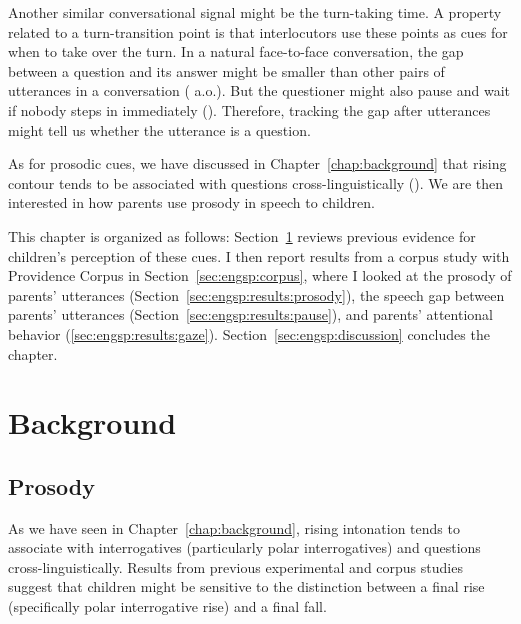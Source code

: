 Another similar conversational signal might be the turn-taking time. A property related to a turn-transition point is that interlocutors use these points as cues for when to take over the turn. In a natural face-to-face conversation, the gap between a question and its answer might be smaller than other pairs of utterances in a conversation (\citealt{tice2011turn} a.o.). But the questioner might also pause and wait if nobody steps in immediately (\cite{sacks1978pause}). Therefore, tracking the gap after utterances might tell us whether the utterance is a question.

As for prosodic cues, we have discussed in Chapter~\ref{chap:background} that rising contour tends to be associated with questions cross-linguistically (\cite{gussenhovenchen2000}). We are then interested in how parents use prosody in speech to children.

This chapter is organized as follows: Section~\ref{sec:engsp:background} reviews previous evidence for children's perception of these cues. I then report results from a corpus study with Providence Corpus in Section~\ref{sec:engsp:corpus}, where I looked at the prosody of parents' utterances (Section~\ref{sec:engsp:results:prosody}), the speech gap between parents' utterances (Section~\ref{sec:engsp:results:pause}), and parents' attentional behavior (\ref{sec:engsp:results:gaze}).
Section~\ref{sec:engsp:discussion} concludes the chapter.


\section{Background}
\label{sec:engsp:background}
\subsection{Prosody}
\label{sec:engsp:bg:prosody}
As we have seen in Chapter~\ref{chap:background}, rising intonation tends to associate with interrogatives (particularly polar interrogatives) and questions cross-linguistically. Results from previous experimental and corpus studies suggest that children might be sensitive to the distinction between a final rise (specifically polar interrogative rise) and a final fall. 

